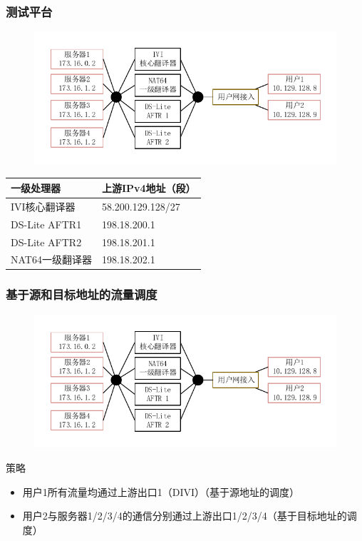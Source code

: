 \documentclass{beamer}
\begin{document}
\begin{frame}
  \frametitle{测试平台}
  \vspace{-1em}
  \begin{figure}
    \includegraphics[width=\textwidth]{figs/12-test-arch.pdf}
  \end{figure}
  \vspace{-2em}

  \begin{table}
    \begin{tabular}{l | l}
      一级处理器 & 上游IPv4地址（段）\\
      \hline
      IVI核心翻译器 & 58.200.129.128/27\\
      DS-Lite AFTR1 & 198.18.200.1\\
      DS-Lite AFTR2 & 198.18.201.1\\
      NAT64一级翻译器 & 198.18.202.1\\
    \end{tabular}
  \end{table}
\end{frame}

\begin{frame}
  \frametitle{基于源和目标地址的流量调度}
  \vspace{-1em}
  \begin{figure}
    \includegraphics[width=\textwidth]{figs/12-test-arch.pdf}
  \end{figure}
  \vspace{-2em}

  \begin{block}{策略}
    \begin{itemize}
    \item 用户1所有流量均通过上游出口1（DIVI）（基于源地址的调度）
    \item 用户2与服务器1/2/3/4的通信分别通过上游出口1/2/3/4（基于目标地址的调度）
    \end{itemize}
  \end{block}
\end{frame}
\end{document}
